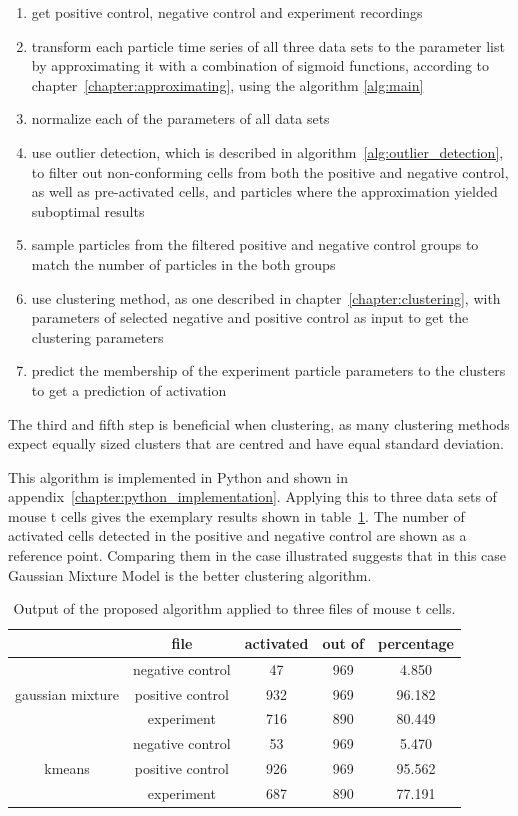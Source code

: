 \begin{enumerate}
	\item get positive control, negative control and experiment recordings
	\item transform each particle time series of all three data sets to the parameter list by approximating it with a combination of sigmoid functions, according to chapter~\ref{chapter:approximating}, using the algorithm \ref{alg:main}
	\item normalize each of the parameters of all data sets
	\item use outlier detection, which is described in algorithm~\ref{alg:outlier_detection}, to filter out non-conforming cells from both the positive and negative control, as well as pre-activated cells, and particles where the approximation yielded suboptimal results
	\item sample particles from the filtered positive and negative control groups to match the number of particles in the both groups
	\item use clustering method, as one described in chapter~\ref{chapter:clustering}, with parameters of selected negative and positive control as input to get the clustering parameters
	\item predict the membership of the experiment particle parameters to the clusters to get a prediction of activation
\end{enumerate}

The third and fifth step is beneficial when clustering, as many clustering methods expect equally sized clusters that are centred and have equal standard deviation. 

This algorithm is implemented in Python and shown in appendix~\ref{chapter:python_implementation}. Applying this to three data sets of mouse t cells gives the exemplary results shown in table~\ref{tab:results_main_algorithm}. The number of activated cells detected in the positive and negative control are shown as a reference point. Comparing them in the case illustrated suggests that in this case Gaussian Mixture Model is the better clustering algorithm.

\begin{table}[h]
	\centering
	\begin{tabular}{|c|c|c|c|c|}
		\hline
		 & file & activated & out of & percentage\\
		 \hline
		  & negative control & 47 & 969 & 4.850\\
		 gaussian mixture & positive control & 932 & 969 & 96.182\\
		  & experiment & 716 & 890 & 80.449\\
		 \hline
		  & negative control & 53 & 969 & 5.470\\
		 kmeans & positive control & 926 & 969 & 95.562\\
		  & experiment & 687 & 890 & 77.191\\
		 \hline
	\end{tabular}
	\caption{Output of the proposed algorithm applied to three files of mouse t cells.}
	\label{tab:results_main_algorithm}
\end{table}

